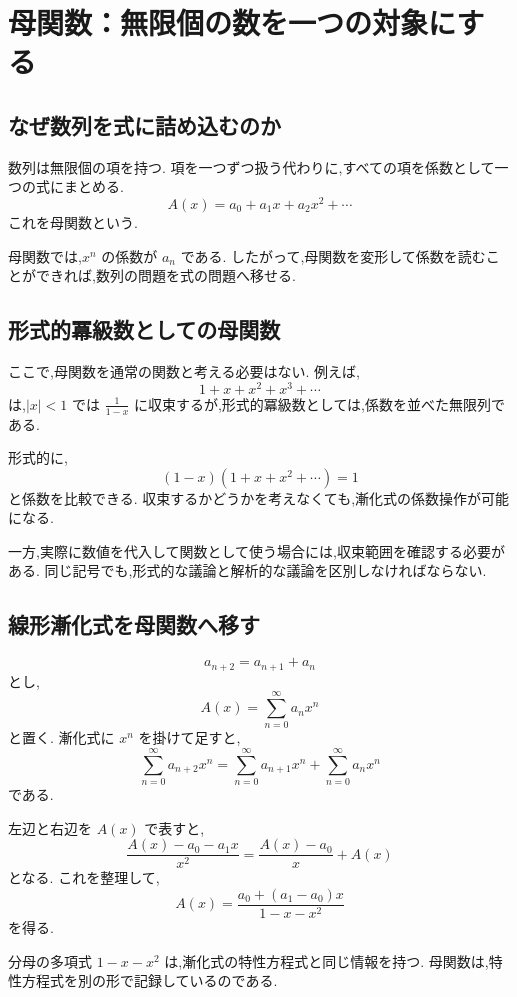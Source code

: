 
\section{母関数：無限個の数を一つの対象にする}

\subsection{なぜ数列を式に詰め込むのか}

数列は無限個の項を持つ.
項を一つずつ扱う代わりに,すべての項を係数として一つの式にまとめる.
\[
  A(x)=a_0+a_1x+a_2x^2+\cdots
\]
これを母関数という.

母関数では,$x^n$ の係数が $a_n$ である.
したがって,母関数を変形して係数を読むことができれば,数列の問題を式の問題へ移せる.

\subsection{形式的冪級数としての母関数}

ここで,母関数を通常の関数と考える必要はない.
例えば,
\[
  1+x+x^2+x^3+\cdots
\]
は,$|x|<1$ では $\frac{1}{1-x}$ に収束するが,形式的冪級数としては,係数を並べた無限列である.

形式的に,
\[
  (1-x)(1+x+x^2+\cdots)=1
\]
と係数を比較できる.
収束するかどうかを考えなくても,漸化式の係数操作が可能になる.

一方,実際に数値を代入して関数として使う場合には,収束範囲を確認する必要がある.
同じ記号でも,形式的な議論と解析的な議論を区別しなければならない.

\subsection{線形漸化式を母関数へ移す}

\[
  a_{n+2}=a_{n+1}+a_n
\]
とし,
\[
  A(x)=\sum_{n=0}^{\infty}a_nx^n
\]
と置く.
漸化式に $x^n$ を掛けて足すと,
\[
  \sum_{n=0}^{\infty}a_{n+2}x^n
  =
  \sum_{n=0}^{\infty}a_{n+1}x^n
  +
  \sum_{n=0}^{\infty}a_nx^n
\]
である.

左辺と右辺を $A(x)$ で表すと,
\[
  \frac{A(x)-a_0-a_1x}{x^2}
  =
  \frac{A(x)-a_0}{x}+A(x)
\]
となる.
これを整理して,
\[
  A(x)=\frac{a_0+(a_1-a_0)x}{1-x-x^2}
\]
を得る.

分母の多項式 $1-x-x^2$ は,漸化式の特性方程式と同じ情報を持つ.
母関数は,特性方程式を別の形で記録しているのである.

